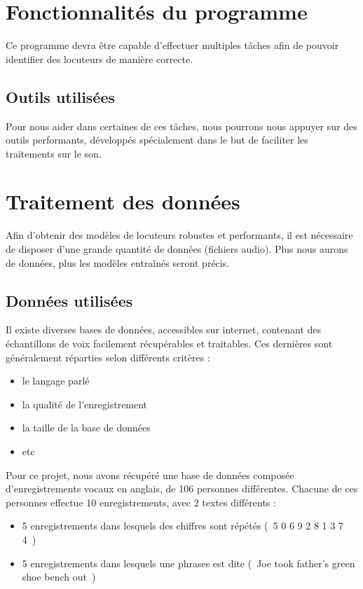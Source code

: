 \documentclass[a4paper, 12pt]{book}
\newcounter{program}[subsection]
\begin{document}
\section{Fonctionnalités du programme}

Ce programme devra être capable d'effectuer multiples tâches afin de pouvoir identifier des locuteurs de manière correcte.

\subsection{Outils utilisées}

Pour nous aider dans certaines de ces tâches, nous pourrons nous appuyer sur des outils performants, développés spécialement dans le but de faciliter les traitements sur le son.
\section{Traitement des données}

Afin d'obtenir des modèles de locuteurs robustes et performants, il est nécessaire de disposer d'une grande quantité de données (fichiers audio). Plus nous aurons de données, plus les modèles entraînés seront précis.  

\subsection{Données utilisées\label{data-split}}

Il existe diverses bases de données, accessibles sur internet, contenant des échantillons de voix facilement récupérables et traitables. Ces dernières sont généralement réparties selon différents critères :
\begin{itemize}
  \item le langage parlé
  \item la qualité de l'enregistrement
  \item la taille de la base de données
  \item etc
\end{itemize}

Pour ce projet, nous avons récupéré une base de données composée d'enregistrements vocaux en anglais, de 106 personnes différentes. Chacune de ces personnes effectue 10 enregistrements, avec 2 textes différents :
\begin{itemize}
  \item 5 enregistrements dans lesquels des chiffres sont répétés (\guillemotleft{}~5 0 6 9 2 8 1 3 7 4~\guillemotright{})
  \item 5 enregistrements dans lesquels une phrases est dite (\guillemotleft{}~Joe took father’s green shoe bench out~\guillemotright{})
\end{itemize}
\end{document}

